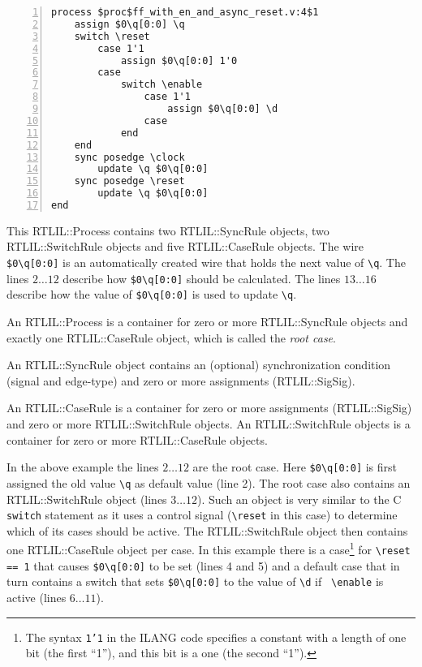 \begin{lstlisting}[numbers=left,frame=single]
process $proc$ff_with_en_and_async_reset.v:4$1
	assign $0\q[0:0] \q
	switch \reset
		case 1'1
			assign $0\q[0:0] 1'0
		case 
			switch \enable
				case 1'1
					assign $0\q[0:0] \d
				case 
			end
	end
	sync posedge \clock
		update \q $0\q[0:0]
	sync posedge \reset
		update \q $0\q[0:0]
end
\end{lstlisting}

This RTLIL::Process contains two RTLIL::SyncRule objects, two RTLIL::SwitchRule
objects and five RTLIL::CaseRule objects. The wire {\tt \$0\textbackslash{}q[0:0]}
is an automatically created wire that holds the next value of {\tt \textbackslash{}q}. The lines
$2 \dots 12$ describe how {\tt \$0\textbackslash{}q[0:0]} should be calculated. The
lines $13 \dots 16$ describe how the value of {\tt \$0\textbackslash{}q[0:0]} is used
to update {\tt \textbackslash{}q}.

An RTLIL::Process is a container for zero or more RTLIL::SyncRule objects and
exactly one RTLIL::CaseRule object, which is called the {\it root case}.

An RTLIL::SyncRule object contains an (optional) synchronization condition
(signal and edge-type) and zero or more assignments (RTLIL::SigSig).

An RTLIL::CaseRule is a container for zero or more assignments (RTLIL::SigSig)
and zero or more RTLIL::SwitchRule objects. An RTLIL::SwitchRule objects is a
container for zero or more RTLIL::CaseRule objects.

In the above example the lines $2 \dots 12$ are the root case. Here {\tt \$0\textbackslash{}q[0:0]} is first 
assigned the old value {\tt \textbackslash{}q} as default value (line 2). The root case
also contains an RTLIL::SwitchRule object (lines $3 \dots 12$). Such an object is very similar to the C {\tt switch}
statement as it uses a control signal ({\tt \textbackslash{}reset} in this case) to determine
which of its cases should be active. The RTLIL::SwitchRule object then contains one RTLIL::CaseRule
object per case. In this example there is a case\footnote{The
syntax {\tt 1'1} in the ILANG code specifies a constant with a length of one bit (the first ``1''),
and this bit is a one (the second ``1'').} for {\tt \textbackslash{}reset == 1} that causes
{\tt \$0\textbackslash{}q[0:0]} to be set (lines 4 and 5) and a default case that in turn contains a switch that
sets {\tt \$0\textbackslash{}q[0:0]} to the value of {\tt \textbackslash{}d} if {\tt
\textbackslash{}enable} is active (lines $6 \dots 11$).

